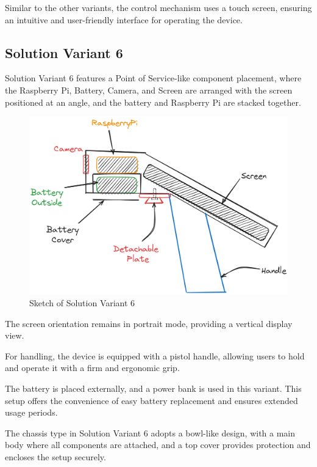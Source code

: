 Similar to the other variants, the control mechanism uses a touch screen, ensuring an intuitive and user-friendly interface for operating the device.

\subsection{Solution Variant 6}

Solution Variant 6 features a Point of Service-like component placement, where the Raspberry Pi, Battery, Camera, and Screen are arranged with the screen positioned at an angle, and the battery and Raspberry Pi are stacked together.

\begin{figure}[ht!]
    \centering
    \includegraphics[width=\linewidth]{texs/Part1/chapter3/image/v6.png}
    \caption{Sketch of Solution Variant 6}
    \label{fig:sketch-solution-variant-6}
\end{figure}

The screen orientation remains in portrait mode, providing a vertical display view.

For handling, the device is equipped with a pistol handle, allowing users to hold and operate it with a firm and ergonomic grip.

The battery is placed externally, and a power bank is used in this variant. This setup offers the convenience of easy battery replacement and ensures extended usage periods.

The chassis type in Solution Variant 6 adopts a bowl-like design, with a main body where all components are attached, and a top cover provides protection and encloses the setup securely.

